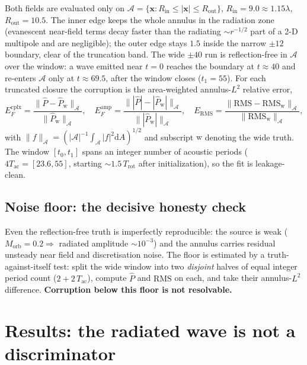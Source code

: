 \documentclass{jfm}
\newcommand{\dd}{\mathrm{d}}
\newcommand{\xv}{\bm{x}}
\newcommand{\Aann}{\mathcal{A}}
\begin{document}
Both fields are evaluated only on $\Aann=\{\xv:R_{\mathrm{in}}\le|\xv|\le R_{\mathrm{out}}\}$,
$R_{\mathrm{in}}=9.0\approx1.15\lambda$, $R_{\mathrm{out}}=10.5$. The inner edge keeps the
whole annulus in the radiation zone (evanescent near-field terms decay faster than the radiating
$\sim r^{-1/2}$ part of a 2-D multipole and are negligible); the outer edge stays $1.5$ inside
the narrow $\pm12$ boundary, clear of the truncation band. The wide $\pm40$ run is
reflection-free in $\Aann$ over the window: a wave emitted near $t=0$ reaches the boundary at
$t\approx40$ and re-enters $\Aann$ only at $t\approx69.5$, after the window closes ($t_1=55$).
For each truncated closure the corruption is the area-weighted annulus-$L^2$ relative error,
\begin{equation}
E_F^{\mathrm{cplx}}=\frac{\|\hat P-\hat P_{\mathrm w}\|_\Aann}{\|\hat P_{\mathrm w}\|_\Aann},\quad
E_F^{\mathrm{amp}}=\frac{\big\||\hat P|-|\hat P_{\mathrm w}|\big\|_\Aann}{\big\||\hat P_{\mathrm w}|\big\|_\Aann},\quad
E_{\mathrm{RMS}}=\frac{\|\mathrm{RMS}-\mathrm{RMS}_{\mathrm w}\|_\Aann}{\|\mathrm{RMS}_{\mathrm w}\|_\Aann},
\end{equation}
with $\|f\|_\Aann=(|\Aann|^{-1}\!\int_\Aann|f|^2\dd A)^{1/2}$ and subscript $\mathrm w$ denoting
the wide truth. The window $[t_0,t_1]$ spans an integer number of acoustic periods
($4T_{\mathrm{ac}}=[23.6,55]$, starting $\sim1.5\,T_{\mathrm{rot}}$ after initialization), so the fit
is leakage-clean.

\subsection{Noise floor: the decisive honesty check}

Even the reflection-free truth is imperfectly reproducible: the source is weak
($M_{\mathrm{orb}}=0.2\Rightarrow$ radiated amplitude $\sim10^{-3}$) and the annulus carries
residual unsteady near field and discretisation noise. The floor is estimated by a
truth-against-itself test: split the wide window into two \emph{disjoint} halves of equal
integer period count ($2+2\,T_{\mathrm{ac}}$), compute $\hat P$ and $\mathrm{RMS}$ on each, and
take their annulus-$L^2$ difference. \textbf{Corruption below this floor is not resolvable.}

\section{Results: the radiated wave is not a discriminator}\label{sec:cvpresults}
\end{document}
